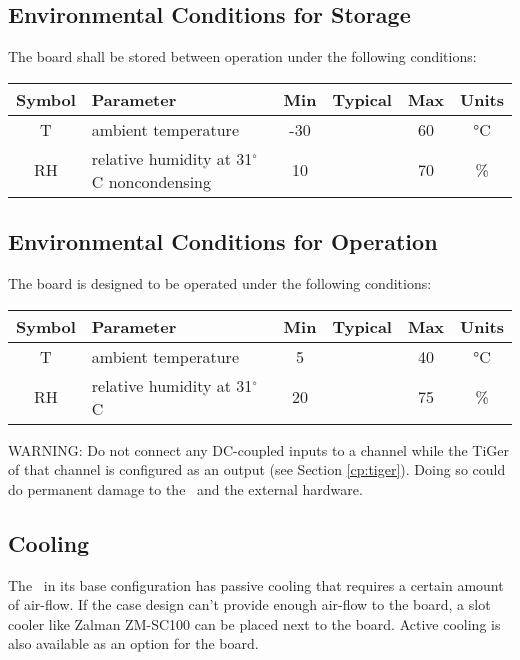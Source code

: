 \newpage
\subsection{Environmental Conditions for Storage}

	The board shall be stored between operation under the following conditions:

	\noindent
	\begin{tabularx}{\textwidth}{|c|X|c|c|c|c|}
		\hline
		Symbol & Parameter & Min & Typical & Max & Units\\
		\hline\hline
		T & ambient temperature & -30 && 60 & \si{\degreeCelsius}\\
		\hline
		RH & relative humidity at 31$^{\circ}$C noncondensing & 10 && 70 & \%\\
		\hline
	\end{tabularx}

\subsection{Environmental Conditions for Operation}

	The board is designed to be operated under the following conditions:

	\noindent
	\begin{tabularx}{\textwidth}{|c|X|c|c|c|c|}
		\hline
		Symbol & Parameter & Min & Typical & Max & Units\\
		\hline\hline
		T & ambient temperature & 5 && 40 & \si{\degreeCelsius}\\
		\hline
		RH & relative humidity at 31$^{\circ}$C & 20 && 75 & \%\\
		\hline
	\end{tabularx}

	WARNING: Do not connect any DC-coupled inputs to a channel while the TiGer of that channel is configured as an output (see Section \ref{cp:tiger}).
	Doing so could do permanent damage to the \deviceName\ and the external hardware.

\subsection{Cooling}

	The \deviceName\ in its base configuration has passive cooling that requires a certain amount of air-flow. 
	If the case design can't provide enough air-flow to the board, a slot cooler like Zalman ZM-SC100 can be placed next to the board. 
	Active cooling is also available as an option for the board.


